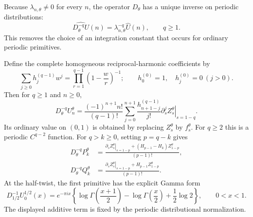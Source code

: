 Because $\lambda_{n,\theta}\ne0$ for every $n$, the operator
$D_\theta$ has a unique inverse on periodic distributions:
\[
 \widehat{D_\theta^{-q}U}(n)
       =\lambda_{n,\theta}^{-q}\widehat U(n),\qquad q\ge1.
\]
This removes the choice of an integration constant that occurs
for ordinary periodic primitives.

\begin{theorem}
\label{tw:thm:primitives}
Define the complete homogeneous reciprocal-harmonic coefficients by
\begin{equation}\label{tw:eq:hcomplete}
 \sum_{j\ge0}h_j^{(q-1)}w^j
       =\prod_{r=1}^{q-1}\left(1-\frac wr\right)^{-1};
 \qquad h_0^{(0)}=1,\quad h_j^{(0)}=0\ (j>0).
\end{equation}
Then for $q\ge1$ and $n\ge0$,
\begin{equation}\label{tw:eq:primitive}
 D_\theta^{-q}U_n^\theta
 =\frac{(-1)^{n+1}n!}{(q-1)!}
       \sum_{j=0}^{n+1}\frac{h_{n+1-j}^{(q-1)}}{j!}
            \left.\partial_s^j Z_s^\theta\right|_{s=1-q}.
\end{equation}
Its ordinary value on $(0,1)$ is obtained by replacing
$Z_s^\theta$ by $f_s^\theta$. For $q\ge2$ this is a periodic
$C^{q-2}$ function. For $q>k\ge0$, setting $p=q-k$ gives
\begin{align}
 D_\theta^{-q}P_k^\theta
  &=\frac{
       \left.\partial_s Z_s^\theta\right|_{s=1-p}
           +(H_{p-1}-H_k)Z_{1-p}^\theta}{(p-1)!},
       \label{tw:eq:Pprimitive}\\
 D_\theta^{-q}Q_k^\theta
  &=\frac{
       \left.\partial_s Z_s^\theta\right|_{s=1-p}
           +H_{p-1}Z_{1-p}^\theta}{(p-1)!}.
       \label{tw:eq:Qprimitive}
\end{align}
At the half-twist, the first primitive has the explicit Gamma form
\begin{equation}\label{tw:eq:halfGamma}
 D_{1/2}^{-1}U_0^{1/2}(x)
  =e^{-\pi ix}\left\{
      \log\Gamma\left(\frac{x+1}{2}\right)
      -\log\Gamma\left(\frac{x}{2}\right)+\frac12\log2\right\},
 \qquad 0<x<1.
\end{equation}
The displayed additive term is fixed by the periodic distributional
normalization.
\end{theorem}

